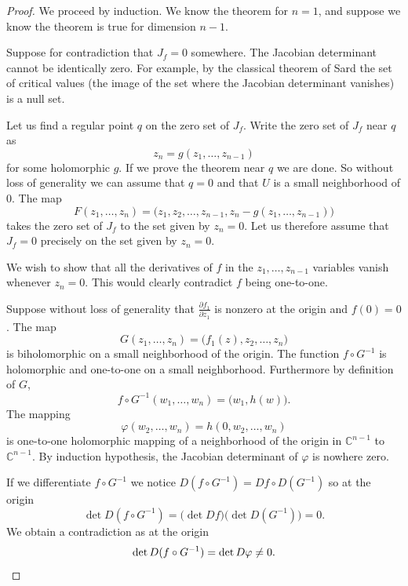 \documentclass[12pt,openany]{book}
\newcommand{\C}{{\mathbb{C}}}
\theoremstyle{plain}
\theoremstyle{remark}
\theoremstyle{definition}
\theoremstyle{exercise}
\theoremstyle{example}
\begin{document}
\begin{proof}
We proceed by induction.  We know the theorem for $n=1$,
and suppose we know the theorem is true for dimension $n-1$.

Suppose for contradiction that $J_f = 0$ somewhere.
The Jacobian determinant cannot be identically zero.  For example, by the
classical theorem of Sard the set of critical values (the image of the set
where the Jacobian determinant vanishes) is a null set.

Let us find a regular point $q$ on the zero set of $J_f$.
Write the zero set of $J_f$ near $q$ as
\begin{equation*}
z_n = g(z_1,\ldots,z_{n-1})
\end{equation*}
for some holomorphic $g$.
If we prove the theorem near $q$ we are done.  So without loss of generality
we can assume that $q=0$ and that $U$ is a
small neighborhood of $0$.  The map
\begin{equation*}
F(z_1,\ldots,z_n) = \bigl(z_1,z_2,\ldots,z_{n-1},z_n-g(z_1,\ldots,z_{n-1}) \bigr)
\end{equation*}
takes the zero set of $J_f$ to the set given by $z_n=0$.  Let us therefore assume
that $J_f = 0$ precisely on the set given by $z_n=0$.

We wish to show that all the derivatives of $f$ in the $z_1,\ldots,z_{n-1}$
variables vanish whenever $z_n = 0$.  This
would clearly contradict $f$ being one-to-one.

Suppose without loss of generality that $\frac{\partial f_1}{\partial z_1}$
is nonzero at the origin and $f(0) = 0$.
The map
\begin{equation*}
G(z_1,\ldots,z_n) = \bigl(f_1(z),z_2,\ldots,z_n\bigr)
\end{equation*}
is biholomorphic on a small neighborhood of the origin.
The function $f \circ G^{-1}$ is holomorphic and one-to-one on a small
neighborhood.  Furthermore by definition of $G$,
\begin{equation*}
f \circ G^{-1} (w_1,\ldots,w_n) = \bigl(w_1,h(w)\bigr) .
\end{equation*}
The mapping
\begin{equation*}
\varphi(w_2,\ldots,w_n) = h(0,w_2,\ldots,w_n)
\end{equation*}
is one-to-one holomorphic mapping of a neighborhood of the origin in
$\C^{n-1}$ to $\C^{n-1}$.  By induction hypothesis, the Jacobian determinant of
$\varphi$ is nowhere zero.

If we differentiate $f \circ G^{-1}$ we notice 
$D(f \circ G^{-1}) = Df \circ D(G^{-1})$
so at the origin
\begin{equation*}
\det D(f \circ G^{-1}) = \bigl(\det Df\bigr) \bigl(\det D(G^{-1})\bigr) = 0.
\end{equation*}
We obtain a contradiction as at the origin
\begin{equation*}
\det 
D(f \circ G^{-1})
= \det D\varphi \not= 0 . \qedhere
\end{equation*}
\end{proof}
\end{document}
